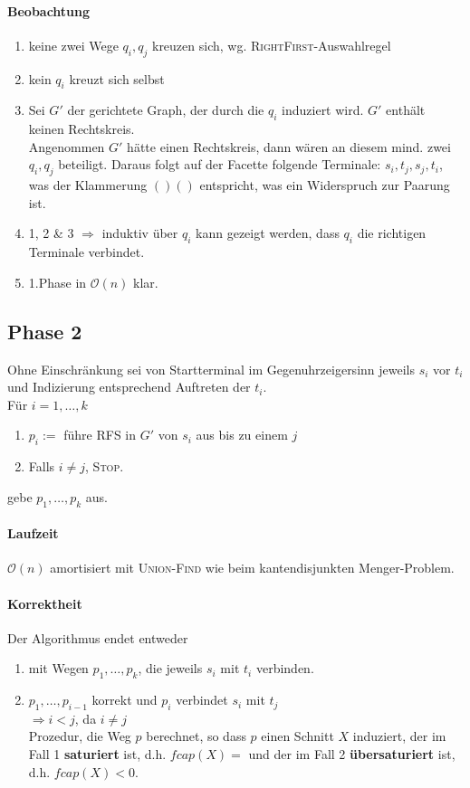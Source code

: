 \documentclass{article}
\newcommand{\df}[1]{\textbf{#1}\index{#1}}
\renewcommand{\O}[1]{\mathcal{O}\left(#1\right)}
\begin{document}
\paragraph{Beobachtung} 
\begin{enumerate}
	\item keine zwei Wege $q_i, q_j$ kreuzen sich, wg. \textsc{RightFirst}-Auswahlregel
	\item kein $q_i$ kreuzt sich selbst
	\item Sei $G'$ der gerichtete Graph, der durch die $q_i$ induziert wird. $G'$ enthält keinen Rechtskreis.\\
	Angenommen $G'$ hätte einen Rechtskreis, dann wären an diesem mind. zwei $q_i, q_j$ beteiligt. Daraus folgt auf der Facette folgende Terminale: $s_i, t_j, s_j, t_i$, was der Klammerung $()()$ entspricht, was ein Widerspruch zur Paarung ist.\\
	\item 1, 2 \& 3 $\Longrightarrow$ induktiv über $q_i$ kann gezeigt werden, dass $q_i$ die richtigen Terminale verbindet.
	\item 1.Phase in $\O{n}$ klar.
\end{enumerate}


\subsection{Phase 2}
Ohne Einschränkung sei von Startterminal im Gegenuhrzeigersinn jeweils $s_i$ vor $t_i$ und Indizierung entsprechend Auftreten der $t_i$.\\
Für $i = 1, \ldots, k$
\begin{enumerate}
	\item $p_i := $ führe \textsc{RFS} in $G'$ von $s_i$ aus bis zu einem $j$
	\item Falls $i \neq j$, \textsc{Stop}.
\end{enumerate}
gebe $p_1,\ldots, p_k$ aus.

\paragraph{Laufzeit}
$\O{n}$ amortisiert mit \textsc{Union-Find} wie beim kantendisjunkten Menger-Problem.

\paragraph{Korrektheit}
Der Algorithmus endet entweder
\begin{enumerate}
	\item mit Wegen $p_1,\ldots, p_k$, die jeweils $s_i$ mit $t_i$ verbinden.
	\item $p_1,\ldots, p_{i-1}$ korrekt und $p_i$ verbindet $s_i$ mit $t_j$\\
	$\Longrightarrow i < j$, da $i \neq j$\\
	Prozedur, die Weg $p$ berechnet, so dass $p$ einen Schnitt $X$ induziert, der im Fall 1 \df{saturiert} ist, d.h. $fcap(X) = $ und der im Fall 2 \df{übersaturiert} ist, d.h. $fcap(X) < 0$.
\end{enumerate}
\end{document}

